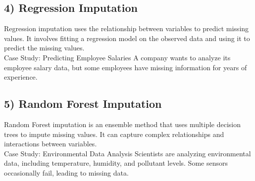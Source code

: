 \documentclass{article}
\begin{document}
\subsection*{4) Regression Imputation}
Regression imputation uses the relationship between variables to predict missing values. It involves fitting a regression model on the observed data and using it to predict the missing values.
\\
Case Study: Predicting Employee Salaries
A company wants to analyze its employee salary data, but some employees have missing information for years of experience.
\subsection*{5) Random Forest Imputation}
Random Forest imputation is an ensemble method that uses multiple decision trees to impute missing values. It can capture complex relationships and interactions between variables.
\\
Case Study: Environmental Data Analysis
Scientists are analyzing environmental data, including temperature, humidity, and pollutant levels. Some sensors occasionally fail, leading to missing data.
\end{document}
